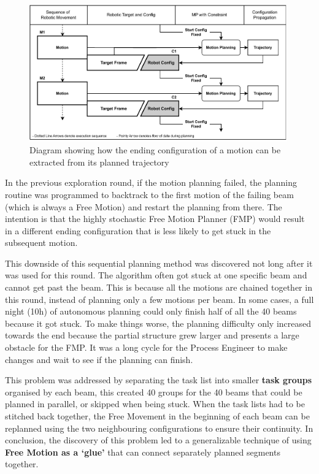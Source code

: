 \begin{figure}[!h]
    \centering
    \includegraphics[width=0.99\textwidth]{images/6a/image8.pdf}
    \caption{Diagram showing how the ending configuration of a motion can be extracted from its planned trajectory}
    \label{fig:extract-ending-configuration}
\end{figure}

In the previous exploration round, if the motion planning failed, the planning routine was programmed to backtrack to the first motion of the failing beam (which is always a Free Motion) and restart the planning from there. The intention is that the highly stochastic Free Motion Planner (FMP) would result in a different ending configuration that is less likely to get stuck in the subsequent motion.

This downside of this sequential planning method was discovered not long after it was used for this round. The algorithm often got stuck at one specific beam and cannot get past the beam. This is because all the motions are chained together in this round, instead of planning only a few motions per beam. In some cases, a full night (10h) of autonomous planning could only finish half of all the 40 beams because it got stuck. To make things worse, the planning difficulty only increased towards the end because the partial structure grew larger and presents a large obstacle for the FMP. It was a long cycle for the Process Engineer to make changes and wait to see if the planning can finish.

This problem was addressed by separating the task list into smaller \textbf{task groups} organised by each beam, this created 40 groups for the 40 beams that could be planned in parallel, or skipped when being stuck. When the task lists had to be stitched back together, the Free Movement in the beginning of each beam can be replanned using the two neighbouring configurations to ensure their continuity. In conclusion, the discovery of this problem led to a generalizable technique of using \textbf{Free Motion as a ‘glue’} that can connect separately planned segments together.

